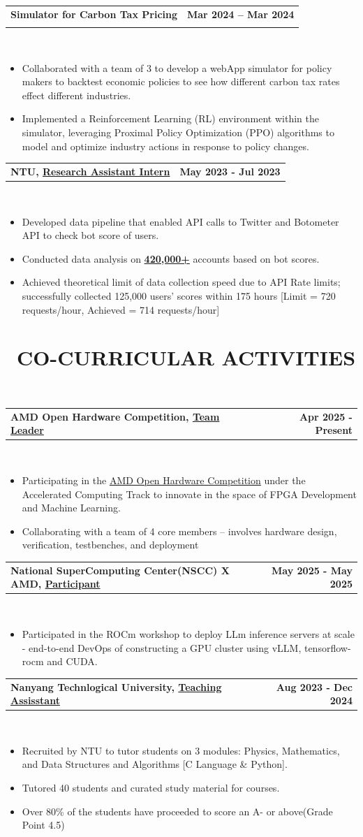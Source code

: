 \documentclass[10pt,a4paper]{article}
\makeatletter
\newcommand{\cvsectionfontsize}{13}
\newcommand{\cvtaglinefirstfontsize}{12}
\newcommand{\cvtaglinesecondfontsize}{12}
\newcommand{\cvbulletfontsize}{11}
\newcommand{\cvsection}[3][.9em]{
  \vspace{-2.7em}
  \section[#3]{\textbf{\scalebox{.68}{\faIcon{#2}}~\fontsize{\cvsectionfontsize}{\cvsectionfontsize}\selectfont\MakeUppercase{#3}}}
  \vspace{-1.8em}
  \noindent\makebox[\textwidth]{\rule{\textwidth}{0.4pt}}
  \\
  \vspace{#1}
}
\newcommand{\cvtagline}[5][1em]{
  \vspace{-1em}
  \noindent\begin{tabularx}{\textwidth}{@{}Xr@{}}
    {\fontsize{\cvtaglinefirstfontsize}{\cvtaglinefirstfontsize}\selectfont\textbf{#2}} & 
    {\fontsize{\cvtaglinefirstfontsize}{\cvtaglinefirstfontsize}\selectfont\textbf{#3}} \\
    \vspace{-0.7em}
    {\fontsize{\cvtaglinesecondfontsize}{\cvtaglinesecondfontsize}\selectfont{#4}} & 
    {\fontsize{\cvtaglinesecondfontsize}{\cvtaglinesecondfontsize}\selectfont\textit{#5}} \\
  \end{tabularx}
  \\
  \vspace{#1}
}
\newcommand{\cvsingletagline}[3][0.5em]{
  \vspace{-1em}
  \noindent\begin{tabularx}{\textwidth}{@{}Xr}
    {\fontsize{\cvtaglinefirstfontsize}{\cvtaglinefirstfontsize}\selectfont\textbf{#2}} & 
    {\fontsize{\cvtaglinefirstfontsize}{\cvtaglinefirstfontsize}\selectfont\textbf{#3}} \\
  \end{tabularx}
  \\
  \vspace{#1}
}
\newcommand{\cvbullets}[2][1em]{
  \vspace{-1.9em}
  {\fontsize{\cvbulletfontsize}{\cvbulletfontsize}\selectfont
    \begin{itemize}[left=0pt,labelsep=1em]
      \setlength\itemsep{0.1em}
      \setlength\labelwidth{1em}
      \setlength\parskip{0pt}
      \setlength{\baselineskip}{1.25\baselineskip}
      
      #2
    \end{itemize}
  }
  \vspace{#1}
}
\makeatother
\begin{document}
\cvtagline{Simulator for Carbon Tax Pricing}{Mar 2024 – Mar 2024}{Hackathon Project: RL  Model to simulate macro-economic environment}{}
\cvbullets{
  \item Collaborated with a team of 3 to develop a webApp simulator for policy makers to backtest economic policies to see how different carbon tax rates effect different industries.
  \item Implemented a Reinforcement Learning (RL) environment within the simulator, leveraging Proximal Policy Optimization (PPO) algorithms to model and optimize industry actions in response to policy changes.
}

\cvsingletagline{NTU, \underline{Research Assistant Intern}}{May 2023 - Jul 2023}
\cvbullets{
\item Developed data pipeline that enabled API calls to Twitter and Botometer API to check bot score of users.
\item Conducted data analysis on \textbf{\underline{420,000+}} accounts based on bot scores.
\item Achieved theoretical limit of data collection speed due to API Rate limits; successfully collected 125,000 users’ scores within 175 hours [Limit = 720 requests/hour, Achieved = 714 requests/hour]

}

\cvsection{lightbulb}{co-curricular activities}

\cvsingletagline{ AMD Open Hardware Competition, \underline{Team Leader}}{Apr 2025 - Present}
\cvbullets{
\item Participating in the \href{https://www.openhw.eu/}{AMD Open Hardware Competition} under the Accelerated Computing Track to innovate in the space of FPGA Development and Machine Learning.
\item  Collaborating with a team of 4 core members – involves hardware design, verification, testbenches, and deployment
}

\cvsingletagline{National SuperComputing Center(NSCC) X AMD, \underline{Participant}}{May 2025 - May 2025}
\cvbullets{
\item Participated in the ROCm workshop to deploy LLm inference servers at scale - end-to-end DevOps of constructing a GPU cluster using vLLM, tensorflow-rocm and CUDA. 
}

\cvsingletagline{Nanyang Technlogical University, \underline{Teaching Assisstant}}{Aug 2023 - Dec 2024}
\cvbullets{
\item Recruited by NTU to tutor students on 3 modules: Physics, Mathematics, and Data Structures and Algorithms [C Language \& Python].
\item Tutored 40 students and curated study material for courses.
\item  Over 80\% of the students have proceeded to score an A- or above(Grade Point 4.5)
}
\end{document}
